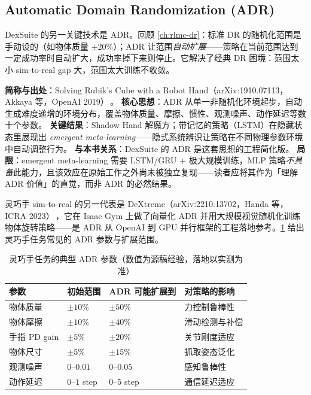 
\subsection{Automatic Domain Randomization (ADR)}
\label{sec:rlmc-manip-adr}

DexSuite 的另一关键技术是 ADR。回顾 \cref{ch:rlmc-dr}：标准 DR 的随机化范围是手动设的（如物体质量 $\pm20\%$）；ADR 让范围\emph{自动扩展}——策略在当前范围达到一定成功率时自动扩大，成功率掉下来则停止。它解决了经典 DR 困境：范围太小 sim-to-real gap 大，范围太大训练不收敛。

\begin{paper}\label{paper:rlmc-manip-adr}
\textbf{简称与出处}：Solving Rubik's Cube with a Robot Hand（arXiv:1910.07113，Akkaya 等，OpenAI 2019）\,\cite{akkaya2019rubik}。
\textbf{核心思想}：ADR 从单一非随机化环境起步，自动生成难度递增的环境分布，覆盖物体质量、摩擦、惯性、观测噪声、动作延迟等数十个参数。
\textbf{关键结果}：Shadow Hand 解魔方；带记忆的策略（LSTM）在隐藏状态里展现出 \emph{emergent meta-learning}——隐式系统辨识让策略在不同物理参数环境中自动调整行为。
\textbf{与本书关系}：DexSuite 的 ADR 是这套思想的工程简化版。
\textbf{局限}：emergent meta-learning 需要 LSTM/GRU + 极大规模训练，MLP 策略\emph{不具备}此能力，且该效应在原始工作之外尚未被独立复现——读者应将其作为「理解 ADR 价值」的直觉，而非 ADR 的必然结果。
\end{paper}

灵巧手 sim-to-real 的另一代表是 DeXtreme（arXiv:2210.13702，Handa 等，ICRA 2023）\,\cite{handa2023dextreme}，它在 Isaac Gym 上做了向量化 ADR 并用大规模视觉随机化训练物体旋转策略——是 ADR 从 OpenAI 到 GPU 并行框架的工程落地参考。\cref{tab:rlmc-manip-adr} 给出灵巧手任务常见的 ADR 参数与扩展范围。

\begin{table}[ht]
\centering
\small
\caption{灵巧手任务的典型 ADR 参数（数值为源稿经验，落地以实测为准）}
\label{tab:rlmc-manip-adr}
\begin{tabular}{@{}llll@{}}
\toprule
参数 & 初始范围 & ADR 可能扩展到 & 对策略的影响 \\
\midrule
物体质量 & $\pm10\%$ & $\pm50\%$ & 力控制鲁棒性 \\
物体摩擦 & $\pm10\%$ & $\pm40\%$ & 滑动检测与补偿 \\
手指 PD gain & $\pm5\%$ & $\pm20\%$ & 关节刚度适应 \\
物体尺寸 & $\pm5\%$ & $\pm15\%$ & 抓取姿态泛化 \\
观测噪声 & $0$--$0.01$ & $0$--$0.05$ & 感知鲁棒性 \\
动作延迟 & $0$--$1$ step & $0$--$5$ step & 通信延迟适应 \\
\bottomrule
\end{tabular}
\end{table}

